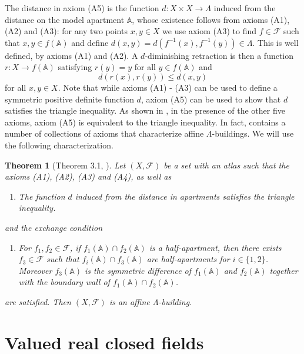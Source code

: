 \documentclass[12pt]{amsart}
\newcommand{\A}{\mathbb{A}}
\newcommand{\Fun}{\mathscr{F}} %
\numberwithin{equation}{section}
\newtheorem{theorem}{Theorem}[section]
\theoremstyle{remark} %
\begin{document}
 	The distance in axiom (A5) is the function $d\colon X\times X \to \Lambda$ induced from the distance on the model apartment $\A$, whose existence follows from axioms (A1), (A2) and (A3): for any two points $x,y\in X$ we use axiom (A3) to find $f\in \Fun$ such that $x,y \in f(\A)$ and define $d(x,y) = d( f^{-1}(x) , f^{-1}(y) ) \in \Lambda $. This is well defined, by axioms (A1) and (A2). A $d$-diminishing retraction is then a function $r \colon X \to f(\A)$ satisfying $r(y)=y$ for all $y\in f(\A)$ and $$
 	d(r(x),r(y)) \leq d(x,y)
 	$$
 	for all $x,y\in X$. Note that while axioms (A1) - (A3) can be used to define a symmetric positive definite function $d$, axiom (A5) can be used to show that $d$ satisfies the triangle inequality. As shown in \cite{BeScSt}, in the presence of the other five axioms, axiom (A5) is equivalent to the triangle inequality. In fact, \cite{BeScSt} contains a number of collections of axioms that characterize affine $\Lambda$-buildings. We will use the following characterization.
 	
 	\begin{theorem}[Theorem 3.1, \cite{BeScSt}] \label{thm:equivalent_axioms}
 		Let $(X,\Fun)$ be a set with an atlas such that the axioms (A1), (A2), (A3) and (A4), as well as
 		\begin{enumerate}
 			\item [(TI)] The function $d$ induced from the distance in apartments satisfies the triangle inequality.
 		\end{enumerate}
 		and the exchange condition
 		\begin{enumerate}
 			\item [(EC)] For $f_1,f_2 \in \Fun$, if $f_1(\A)\cap f_2(\A)$ is a half-apartment, then there exists $f_3 \in \Fun$ such that $f_i(\A)\cap f_3(\A)$ are half-apartments for $i\in \{1,2\}$. Moreover $f_3(\A)$ is the symmetric difference of $f_1(\A)$ and $f_2(\A)$ together with the boundary wall of $f_1(\A) \cap f_2(\A)$.
 		\end{enumerate}
 		are satisfied. Then $(X,\Fun)$ is an affine $\Lambda$-building. 
 	\end{theorem}
 	
 	

 \section{ Valued real closed fields}\label{sec:valued_real_closed_fields}
 
\end{document}
